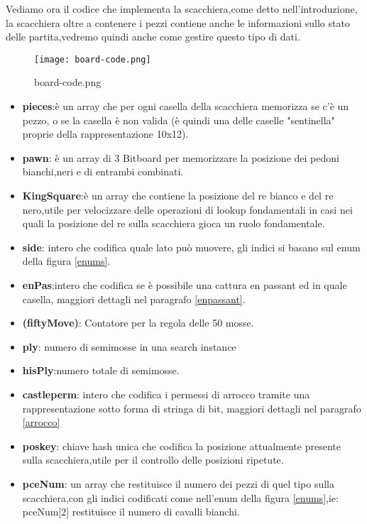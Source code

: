 Vediamo ora il codice che implementa la scacchiera,come detto nell'introduzione, la scacchiera oltre a contenere i pezzi
contiene anche le informazioni sullo stato delle partita,vedremo quindi anche come gestire questo tipo di dati.

\begin{figure}[H]
    \centering
    \texttt{[image: board-code.png]}
    \caption{ board-code.png}
\end{figure}

\begin{itemize}
    \item \textbf{pieces}:è un array che per ogni casella della scacchiera memorizza  se c'è un pezzo, o se la casella è non valida (è quindi una delle caselle "sentinella" proprie della rappresentazione 10x12).
    \item \textbf{pawn}: è un array di 3 Bitboard per memorizzare la posizione dei pedoni bianchi,neri e di entrambi combinati.
    \item \textbf{KingSquare}:è un array che contiene la posizione del re bianco e del re nero,utile per velocizzare delle operazioni di lookup fondamentali in casi nei quali la posizione del re sulla scacchiera gioca
          un ruolo fondamentale.
    \item \textbf{side}: intero che codifica quale lato può muovere, gli indici si basano sul enum della figura \ref{enums}.
    \item \textbf{enPas}:intero che codifica se  è possibile una cattura en passant ed in quale casella, maggiori dettagli nel paragrafo \ref{enpassant}.
    \item \textbf{(fiftyMove)}: Contatore per la regola delle 50 mosse.
    \item \textbf{ply}: numero di semimosse   in una search instance
    \item \textbf{hisPly}:numero totale di semimosse.
    \item \textbf{castleperm}: intero che codifica i permessi di arrocco tramite una rappresentazione sotto forma di stringa di bit, maggiori dettagli nel paragrafo \ref{arrocco}
    \item \textbf{poskey}: chiave hash unica che codifica la posizione attualmente presente sulla scacchiera,utile per il controllo delle posizioni ripetute.
    \item \textbf{pceNum}: un array che restituisce il numero dei pezzi di quel tipo sulla scacchiera,con gli indici codificati  come nell'enum della figura \ref{enums},ie: pceNum[2] restituisce il numero di cavalli bianchi.

\end{itemize}
